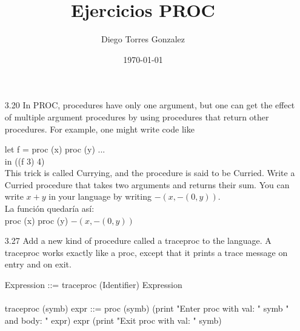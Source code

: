 \documentclass[12pt]{article}
\begin{document}
\title{Ejercicios PROC}
\author{Diego Torres Gonzalez}
\date{\today}

\maketitle

\begin{itemize}

\item[3.20]{In PROC, procedures have only one argument, but one can get the effect of multiple argument procedures by using procedures that return other procedures. 
For example, one might write code like}

	let f = proc (x) proc (y) ... \\
	in ((f 3) 4) \\

	This trick is called Currying, and the procedure is said to be Curried. Write a Curried procedure that takes two arguments and returns their sum. 
	You can write $x + y$ in your language by writing $-(x, -(0, y))$. \\

	La funci\'on quedar\'ia as\'i:\\
		proc (x) proc (y) $-(x, -(0, y))$

\item[3.27]{Add a new kind of procedure called a traceproc to the language. A traceproc works exactly like a proc, except that it prints a trace message on
entry and on exit.}

	Expression ::= traceproc (Identifier) Expression \\\\
	traceproc (symb) expr ::= proc (symb) (print "Enter proc with val: " symb " and body: " expr) expr (print "Exit proc with val: " symb)\\\\



\end{itemize}
\end{document}
